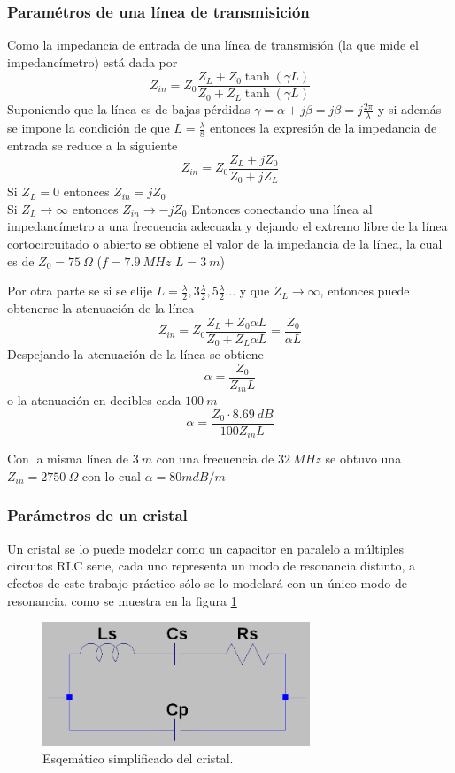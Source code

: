 \documentclass[a4paper,10pt]{article}
\begin{document}
		\subsubsection{Param\'etros de una l\'inea de transmisici\'on}
		Como la impedancia de entrada de una l\'inea de transmisi\'on (la que mide el impedanc\'imetro) est\'a dada por $$Z_{in}=Z_0\frac{Z_L+Z_0\tanh(\gamma L)}{Z_0+Z_L\tanh(\gamma L)}$$
		Suponiendo que la l\'inea es de bajas p\'erdidas $\gamma=\alpha+j\beta=j\beta=j\frac{2\pi}{\lambda}$ y si adem\'as se impone la condici\'on de que $L=\frac{\lambda}{8}$ entonces la expresi\'on de la impedancia de entrada se reduce a la siguiente
		$$Z_{in}=Z_0\frac{Z_L+jZ_0}{Z_0+jZ_L}$$
		Si $Z_L= 0$ entonces $Z_{in}=jZ_0$ \\
		Si $Z_L \rightarrow \infty$ entonces $Z_{in}\rightarrow-jZ_0$
		Entonces conectando una l\'inea al impedanc\'imetro a una frecuencia adecuada y dejando el extremo libre de la l\'inea cortocircuitado o abierto se obtiene el valor de la impedancia de la l\'inea, la cual es de $Z_0=75~\Omega$ ($f=7.9~MHz$ $L=3~m$)
		
		Por otra parte se si se elije $L=\frac{\lambda}{2},3\frac{\lambda}{2}, 5\frac{\lambda}{2} ...$ y que $Z_L\rightarrow\infty$, entonces puede obtenerse la atenuaci\'on de la l\'inea
		$$Z_{in}=Z_0\frac{Z_L+Z_0\alpha L}{Z_0+Z_L\alpha L}=\frac{Z_0}{\alpha L}$$
		Despejando la atenuaci\'on de la l\'inea se obtiene
		$$\alpha=\frac{Z_0}{Z_{in} L}$$
		o la atenuaci\'on en decibles cada $100~m$
		$$\alpha=\frac{Z_0\cdot8.69~dB}{100Z_{in} L}$$
		
		Con la misma l\'inea de $3~m$ con una frecuencia de $32~MHz$ se obtuvo 
		una $Z_{in}=2750~\Omega$ con lo cual $\alpha=80 mdB/m$
		
		\subsubsection{Par\'ametros de un cristal}	
		\indent Un cristal se lo puede modelar como un capacitor en paralelo a 
		múltiples circuitos RLC serie, cada uno representa un modo de resonancia
		distinto, a efectos de este trabajo práctico sólo se lo modelará con un 
		único modo de resonancia, como se muestra en la figura \ref{img004}

		\begin{figure}[!htb]
			\centering
			\includegraphics[width=8cm]{Imagenes/esqXtal.png}
			\caption{Esqemático simplificado del cristal.}
			\label{img004} 
		\end{figure}
\end{document}
